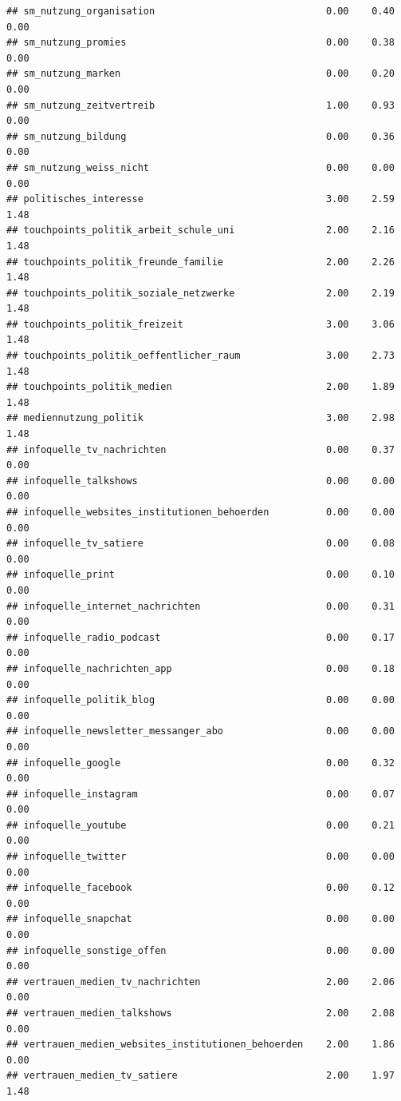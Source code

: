 \documentclass[
]{book}
\begin{document}
\begin{verbatim}
## sm_nutzung_organisation                              0.00    0.40   0.00
## sm_nutzung_promies                                   0.00    0.38   0.00
## sm_nutzung_marken                                    0.00    0.20   0.00
## sm_nutzung_zeitvertreib                              1.00    0.93   0.00
## sm_nutzung_bildung                                   0.00    0.36   0.00
## sm_nutzung_weiss_nicht                               0.00    0.00   0.00
## politisches_interesse                                3.00    2.59   1.48
## touchpoints_politik_arbeit_schule_uni                2.00    2.16   1.48
## touchpoints_politik_freunde_familie                  2.00    2.26   1.48
## touchpoints_politik_soziale_netzwerke                2.00    2.19   1.48
## touchpoints_politik_freizeit                         3.00    3.06   1.48
## touchpoints_politik_oeffentlicher_raum               3.00    2.73   1.48
## touchpoints_politik_medien                           2.00    1.89   1.48
## mediennutzung_politik                                3.00    2.98   1.48
## infoquelle_tv_nachrichten                            0.00    0.37   0.00
## infoquelle_talkshows                                 0.00    0.00   0.00
## infoquelle_websites_institutionen_behoerden          0.00    0.00   0.00
## infoquelle_tv_satiere                                0.00    0.08   0.00
## infoquelle_print                                     0.00    0.10   0.00
## infoquelle_internet_nachrichten                      0.00    0.31   0.00
## infoquelle_radio_podcast                             0.00    0.17   0.00
## infoquelle_nachrichten_app                           0.00    0.18   0.00
## infoquelle_politik_blog                              0.00    0.00   0.00
## infoquelle_newsletter_messanger_abo                  0.00    0.00   0.00
## infoquelle_google                                    0.00    0.32   0.00
## infoquelle_instagram                                 0.00    0.07   0.00
## infoquelle_youtube                                   0.00    0.21   0.00
## infoquelle_twitter                                   0.00    0.00   0.00
## infoquelle_facebook                                  0.00    0.12   0.00
## infoquelle_snapchat                                  0.00    0.00   0.00
## infoquelle_sonstige_offen                            0.00    0.00   0.00
## vertrauen_medien_tv_nachrichten                      2.00    2.06   0.00
## vertrauen_medien_talkshows                           2.00    2.08   0.00
## vertrauen_medien_websites_institutionen_behoerden    2.00    1.86   0.00
## vertrauen_medien_tv_satiere                          2.00    1.97   1.48

\end{verbatim}
\end{document}
